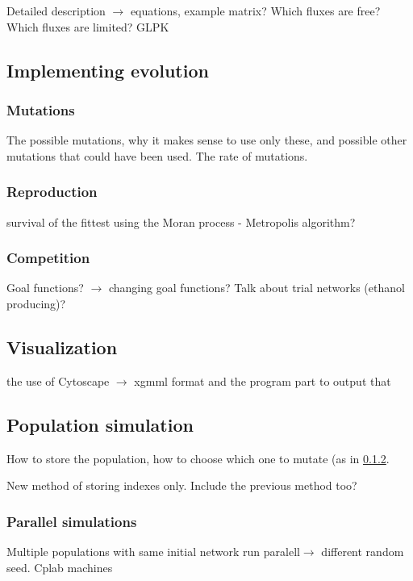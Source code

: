 \documentclass[]{article}
\begin{document}
Detailed description $\rightarrow$ equations, example matrix? Which fluxes are free? Which fluxes are limited? GLPK 


\subsection{Implementing evolution}
\label{sub:Implementing evolution}
\subsubsection{Mutations}
\label{ssub:Mutations}
The possible mutations, why it makes sense to use only these, and possible other mutations that could have been used. The rate of mutations. 
\subsubsection{Reproduction}
\label{ssub:Reproduction}
survival of the fittest using the Moran process - Metropolis algorithm?

\subsubsection{Competition}
\label{ssub:Competition}
Goal functions? $\rightarrow$ changing goal functions? Talk about trial networks (ethanol producing)?

\subsection{Visualization}
\label{sub:visualization}

the use of Cytoscape $\rightarrow$ xgmml format and the  program part to output that

\subsection{Population simulation}
\label{sub:population_simulation}
How to store the population, how to choose which one to mutate (as in \ref{ssub:Reproduction}. 

New method of storing indexes only. Include the previous method too?

\subsubsection{Parallel simulations}
\label{ssub:Paralell simulations}
Multiple populations with same initial network  run paralell$\rightarrow$ different random seed. Cplab machines 
\end{document}
